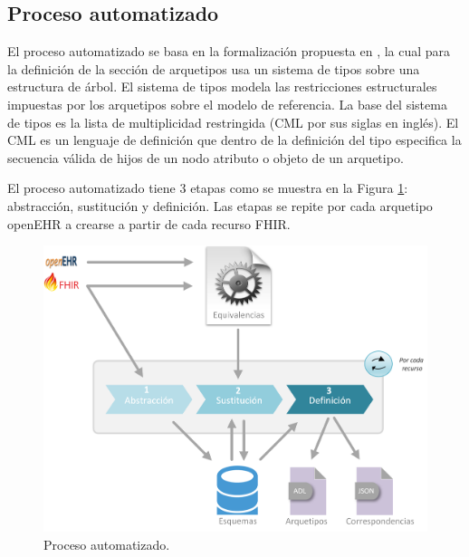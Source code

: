 \subsection{Proceso automatizado}

El proceso automatizado se basa en la formalización propuesta en \cite{Maldonado09}, la cual para la definición de la sección de arquetipos usa un sistema de tipos sobre una estructura de árbol. El sistema de tipos modela las restricciones estructurales impuestas por los arquetipos sobre el modelo de referencia. La base del sistema de tipos es la lista de multiplicidad restringida (CML por sus siglas en inglés). El CML es un lenguaje de definición que dentro de la definición del tipo especifica la secuencia válida de hijos de un nodo atributo o objeto de un arquetipo.

El proceso automatizado tiene 3 etapas como se muestra en la Figura \ref{fig:solution}: abstracción, sustitución y definición. Las etapas se repite por cada arquetipo openEHR a crearse a partir de cada recurso FHIR.

\begin{figure}[h]
  \centering
  \includegraphics[scale=0.5]{./images/solution}
  \caption{Proceso automatizado.}
  \label{fig:solution}
\end{figure}






